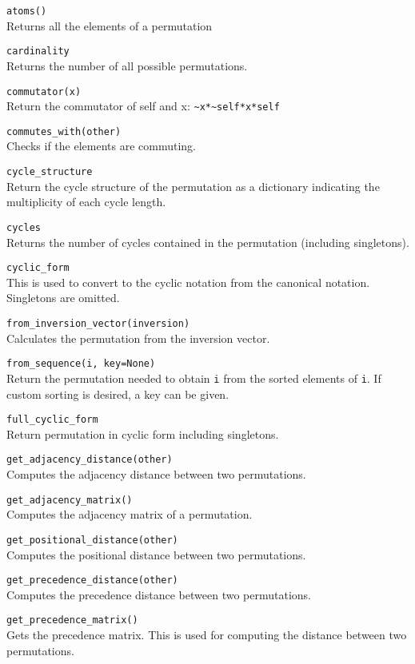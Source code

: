 \documentclass[10pt,landscape]{article}
\begin{document}
\begin{multicols}{3}
\verb!atoms()!\\
Returns all the elements of a permutation

\verb!cardinality!\\
Returns the number of all possible permutations.

\verb!commutator(x)!\\
Return the commutator of self and x: \verb!~x*~self*x*self!


\verb!commutes_with(other)!\\
Checks if the elements are commuting.


\verb!cycle_structure!\\
Return the cycle structure of the permutation as a dictionary indicating the multiplicity of each cycle length.


\verb!cycles! \\
Returns the number of cycles contained in the permutation (including singletons).

\verb!cyclic_form!\\
This is used to convert to the cyclic notation from the canonical notation. Singletons are omitted.

\verb!from_inversion_vector(inversion)!\\
Calculates the permutation from the inversion vector.


\verb!from_sequence(i, key=None)!\\
Return the permutation needed to obtain \verb!i! from the sorted elements of \verb!i!.
If custom sorting is desired, a key can be given.

\verb!full_cyclic_form!\\
Return permutation in cyclic form including singletons.


\verb!get_adjacency_distance(other)!\\
Computes the adjacency distance between two permutations.


\verb!get_adjacency_matrix()!\\
Computes the adjacency matrix of a permutation.


\verb!get_positional_distance(other)!\\
Computes the positional distance between two permutations.


\verb!get_precedence_distance(other)!\\
Computes the precedence distance between two permutations.


\verb!get_precedence_matrix()!\\
Gets the precedence matrix. This is used for computing the distance between two permutations.



\end{multicols}
\end{document}
